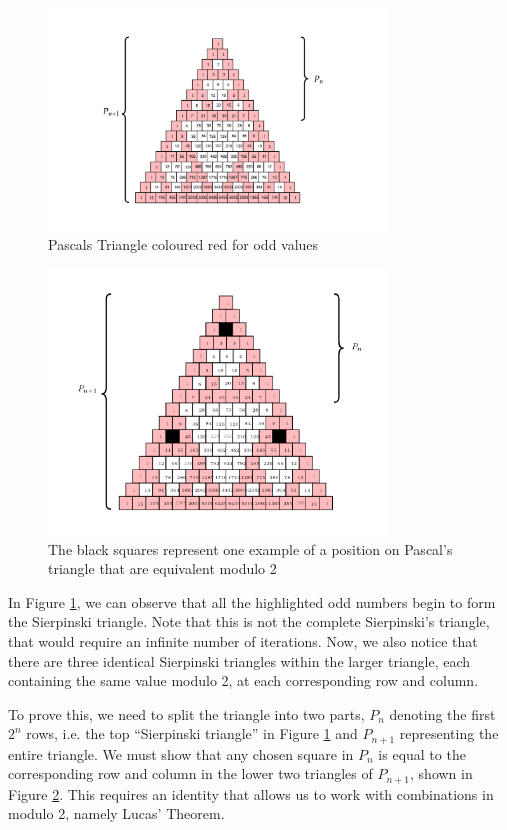 \documentclass[a4paper,11pt,twoside]{article}
\begin{document}
\begin{figure}[htbp]
\centering
\includegraphics[width=9cm]{media/tikz/pascal-sierpinski-tri.png}
\caption{\label{fig:pascal-sierpinski-tri}Pascals Triangle coloured red for odd values}
\end{figure}

\begin{figure}[htbp]
\centering
\includegraphics[width=9cm]{media/tikz/row-column-pascal.png}
\caption{\label{fig:row-column-pascal}The black squares represent one example of a position on Pascal's triangle that are equivalent modulo 2}
\end{figure}

In Figure \ref{fig:pascal-sierpinski-tri}, we can observe that all the highlighted odd numbers begin to form the Sierpinski triangle. Note that this is not the complete Sierpinski's triangle, that would require an infinite number of iterations. Now, we also notice that there are three identical Sierpinski triangles within the larger triangle, each containing the same value modulo 2, at each corresponding row and column.

To prove this, we need to split the triangle into two parts, \(P_{n}\) denoting the first \(2^{n}\) rows, i.e. the top ``Sierpinski triangle'' in Figure \ref{fig:pascal-sierpinski-tri} and \(P_{n+1}\) representing the entire triangle. We must show that any chosen square in \(P_{n}\) is equal to the corresponding row and column in the lower two triangles of \(P_{n+1}\), shown in Figure \ref{fig:row-column-pascal}. This requires an identity that allows us to work with combinations in modulo 2, namely Lucas' Theorem.
\end{document}
